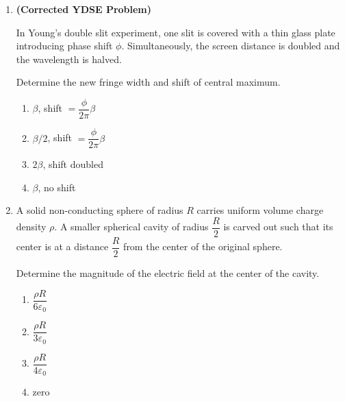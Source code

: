 \documentclass[12pt]{article}
\begin{document}
\begin{enumerate}
\item
\textbf{(Corrected YDSE Problem)}

In Young’s double slit experiment, one slit is covered with a thin glass plate introducing phase shift $\phi$. Simultaneously, the screen distance is doubled and the wavelength is halved.

Determine the new fringe width and shift of central maximum.

\begin{center}
\end{center}

\begin{enumerate}
\item $\beta$, shift $=\dfrac{\phi}{2\pi}\beta$
\item $\beta/2$, shift $=\dfrac{\phi}{2\pi}\beta$
\item $2\beta$, shift doubled
\item $\beta$, no shift
\end{enumerate}
\item
A solid non-conducting sphere of radius $R$ carries uniform volume charge density $\rho$. 
A smaller spherical cavity of radius $\dfrac{R}{2}$ is carved out such that its center is at a distance $\dfrac{R}{2}$ from the center of the original sphere.

Determine the magnitude of the electric field at the center of the cavity.

\begin{enumerate}
\item $\dfrac{\rho R}{6\varepsilon_0}$
\item $\dfrac{\rho R}{3\varepsilon_0}$
\item $\dfrac{\rho R}{4\varepsilon_0}$
\item zero
\end{enumerate}

\end{enumerate}
\end{document}
